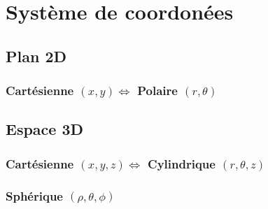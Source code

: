 \section{Système de coordonées}
\subsection{Plan 2D}
\subsubsection{Cartésienne $(x,y) \Longleftrightarrow$ Polaire $(r,\theta)$}


\subsection{Espace 3D}
\subsubsection{Cartésienne $(x,y,z) \Longleftrightarrow$ Cylindrique $(r,\theta,z)$}


\subsubsection{Sphérique $(\rho,\theta,\phi)$}
